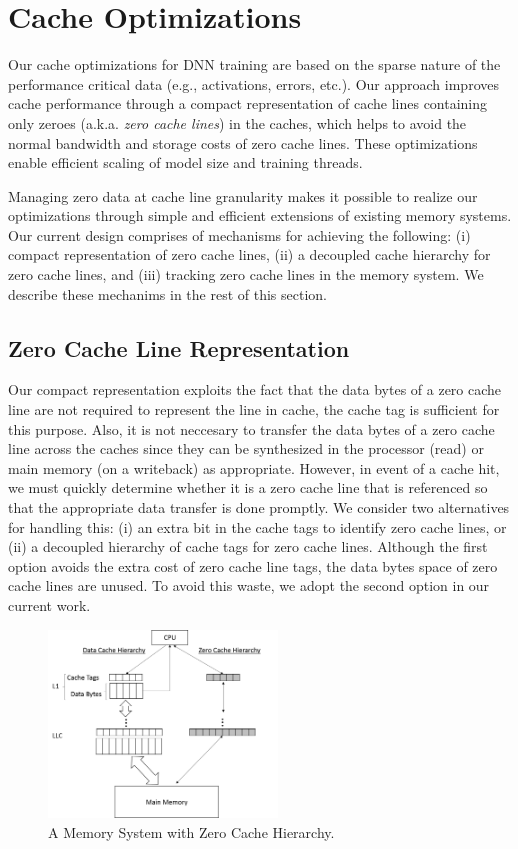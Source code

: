 \section{Cache Optimizations}
\label{sec:cache_opt}

Our cache optimizations for DNN training are based on the sparse nature of the performance critical data (e.g., activations, errors, etc.).  Our approach improves cache performance through a compact representation of cache lines containing only zeroes (a.k.a. \emph{zero cache lines}) in the caches, which helps to avoid  the normal bandwidth and storage costs of zero cache lines. These optimizations enable efficient scaling of model size and training threads.  

Managing zero data at cache line granularity makes it possible to realize our optimizations through simple and efficient extensions of existing memory systems.  Our current design comprises of mechanisms for achieving the following: (i) compact representation of zero cache lines, (ii) a decoupled cache hierarchy for zero cache lines, and (iii) tracking zero cache lines in the memory system.  We describe these mechanims in the rest of this section.

\subsection{Zero Cache Line Representation}

Our compact representation exploits the fact that the data bytes of a zero cache line are not required to represent the line in cache, the cache tag is sufficient for this purpose. Also, it is not neccesary to transfer the data bytes of a zero cache line across the caches since they can be synthesized in the processor (read) or main memory (on a writeback) as appropriate.  However, in event of a cache hit, we must quickly determine whether it is a zero cache line that is referenced so that the appropriate data transfer is done promptly. We consider two alternatives for handling this: (i) an extra bit in the cache tags to identify zero cache lines, or (ii) a decoupled hierarchy of cache tags for zero cache lines.  Although the first option avoids the extra cost of zero cache line tags, the data bytes space of zero cache lines are unused.  To avoid this waste, we adopt the second option in our current work. 

\begin{figure}[!t]
\centering
\includegraphics[width=2.4in]{Figures/zero_cache_hierarchy.png}
\caption{A Memory System with Zero Cache Hierarchy.}
\label{fig:zero_cache_hierarchy}
\end{figure}

